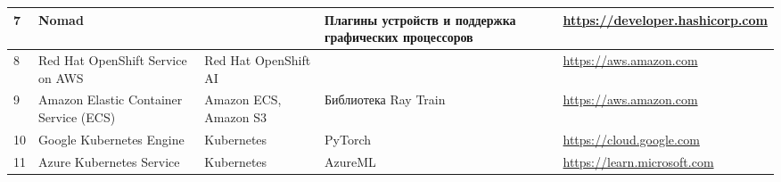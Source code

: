 \begin{table}[H]
\begin{tabular}{|l|p{}|p{}|p{}|p{}|}
7 & Nomad & & Плагины устройств и поддержка графических процессоров & \href{https://developer.hashicorp.com/nomad/intro}{https://developer.hashicorp.com} \\ \hline
8 & Red Hat OpenShift Service on AWS & Red Hat OpenShift AI & & \href{https://aws.amazon.com/marketplace/pp/prodview-co7uaxdm7qnkq}{https://aws.amazon.com} \\ \hline
9 & Amazon Elastic Container Service (ECS) & Amazon ECS, Amazon S3 & Библиотека Ray Train & \href{https://aws.amazon.com/ru/blogs/containers/distributed-machine-learning-with-amazon-ecs/}{https://aws.amazon.com} \\ \hline
10 & Google Kubernetes Engine & Kubernetes & PyTorch & \href{ https://cloud.google.com/deep-learning-containers/docs/kubernetes-container}{ https://cloud.google.com} \\ \hline
11 & Azure Kubernetes Service & Kubernetes & AzureML & \href{https://learn.microsoft.com/en-us/azure/machine-learning/how-to-deploy-azure-kubernetes-service?view=azureml-api-1\&tabs=python}{https://learn.microsoft.com} \\ \hline
\end{tabular}
\end{table}

